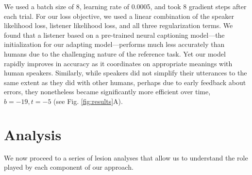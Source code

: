 We used a batch size of 8, learning rate of 0.0005, and took 8 gradient steps after each trial. 
For our loss objective, we used a linear combination of the speaker likelihood loss, listener likelihood loss, and all three regularization terms.
We found that a listener based on a pre-trained neural captioning model---the initialization for our adapting model---performs much less accurately than humans due to the challenging nature of the reference task. 
Yet our model rapidly improves in accuracy as it coordinates on appropriate meanings with human speakers.
Similarly, while speakers did not simplify their utterances to the same extent as they did with other humans, perhaps due to early feedback about errors, they nonetheless became significantly more efficient over time, $b = -19, t = -5$ (see Fig. \ref{fig:results}A).

\section{Analysis}

We now proceed to a series of lesion analyses that allow us to understand the role played by each component of our approach.

%
%

